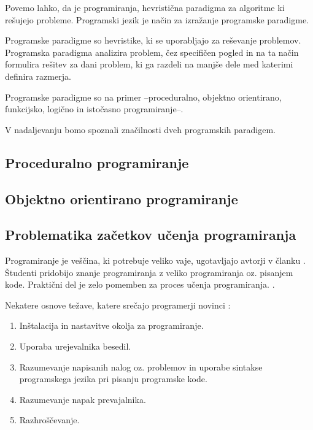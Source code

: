 Povemo lahko, da je programiranja, hevristična paradigma za algoritme
ki rešujejo probleme. Programski jezik je način za izražanje
programske paradigme.

Programske paradigme so hevristike, ki se uporabljajo za reševanje
problemov. Programska paradigma analizira problem, čez specifičen
pogled in na ta način formulira rešitev za dani problem, ki ga razdeli
na manjše dele med katerimi definira razmerja.

Programske paradigme so na primer --proceduralno, objektno orientirano,
funkcijsko, logično in istočasno programiranje--.

V nadaljevanju bomo spoznali značilnosti dveh programskih paradigem.

\subsection{Proceduralno programiranje}
\label{sec:proceduralno_programiranje}

\subsection{Objektno orientirano programiranje}
\label{sec:objektno_orijentirano_programiranje}



\subsection{Problematika začetkov učenja programiranja}
\label{sec:Problematika_začetkov_učenja_programiranja}



Programiranje je veščina, ki potrebuje veliko vaje, ugotavljajo
avtorji v članku \cite{ITaLCP_DistanceEdu}. Študenti pridobijo znanje
programiranja z veliko programiranja oz. pisanjem kode. Praktični del je
zelo pomemben za proces učenja programiranja.
\cite{ITaLCP_DistanceEdu}.

Nekatere osnove težave, katere srečajo programerji novinci \cite{thesisAWebP}:
\begin{enumerate}
\item
  Inštalacija in nastavitve okolja za programiranje.
\item
  Uporaba urejevalnika besedil.
\item Razumevanje napisanih nalog oz. problemov in uporabe sintakse
  programskega jezika pri pisanju programske kode.
\item
  Razumevanje napak prevajalnika.
\item
  Razhroščevanje.
\end{enumerate}

